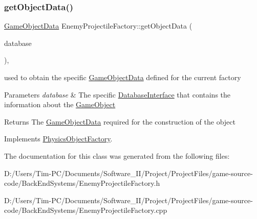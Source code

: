 \subsubsection{\texorpdfstring{get\+Object\+Data()}{getObjectData()}}
{\footnotesize\ttfamily \hyperlink{struct_game_object_data}{Game\+Object\+Data} Enemy\+Projectile\+Factory\+::get\+Object\+Data (\begin{DoxyParamCaption}\item[{const std\+::shared\+\_\+ptr$<$ \hyperlink{class_database_interface}{Database\+Interface} $>$ \&}]{database }\end{DoxyParamCaption})\hspace{0.3cm}{\ttfamily [override]}, {\ttfamily [virtual]}}



used to obtain the specific \hyperlink{struct_game_object_data}{Game\+Object\+Data} defined for the current factory 


\begin{DoxyParams}{Parameters}
{\em database} & The specific \hyperlink{class_database_interface}{Database\+Interface} that contains the information about the \hyperlink{class_game_object}{Game\+Object} \\
\hline
\end{DoxyParams}
\begin{DoxyReturn}{Returns}
The \hyperlink{struct_game_object_data}{Game\+Object\+Data} required for the construction of the object 
\end{DoxyReturn}


Implements \hyperlink{class_physics_object_factory_aa59f52d3adc1fac676f4a8a3c2de9ba9}{Physics\+Object\+Factory}.



The documentation for this class was generated from the following files\+:\begin{DoxyCompactItemize}
\item 
D\+:/\+Users/\+Tim-\/\+P\+C/\+Documents/\+Software\+\_\+\+I\+I/\+Project/\+Project\+Files/game-\/source-\/code/\+Back\+End\+Systems/Enemy\+Projectile\+Factory.\+h\item 
D\+:/\+Users/\+Tim-\/\+P\+C/\+Documents/\+Software\+\_\+\+I\+I/\+Project/\+Project\+Files/game-\/source-\/code/\+Back\+End\+Systems/Enemy\+Projectile\+Factory.\+cpp\end{DoxyCompactItemize}
